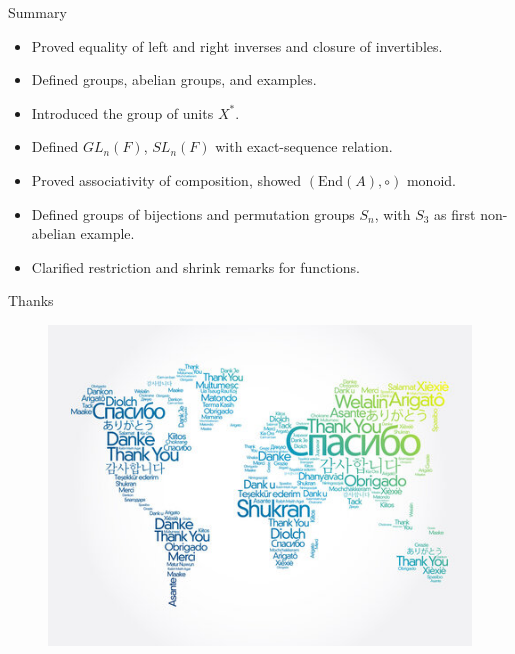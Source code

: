 \documentclass[11pt,aspectratio=43,ignorenonframetext,t]{beamer}
\newcounter{example_number} %
\begin{document}
\begin{frame}{Summary}
\begin{itemize}
  \item Proved equality of left and right inverses and closure of invertibles.
  \item Defined groups, abelian groups, and examples.
  \item Introduced the group of units \(X^*\).
  \item Defined \(GL_n(F)\), \(SL_n(F)\) with exact-sequence relation.
  \item Proved associativity of composition, showed \((\text{End}(A),\circ)\) monoid.
  \item Defined groups of bijections and permutation groups \(S_n\), with \(S_3\) as first non-abelian example.
  \item Clarified restriction and shrink remarks for functions.
\end{itemize}
\end{frame}


\begin{frame}{Thanks}
    \begin{figure}
        \centering
        \includegraphics[width=0.85\linewidth]{Thanks.png}
    \end{figure}
\end{frame}
\end{document}
